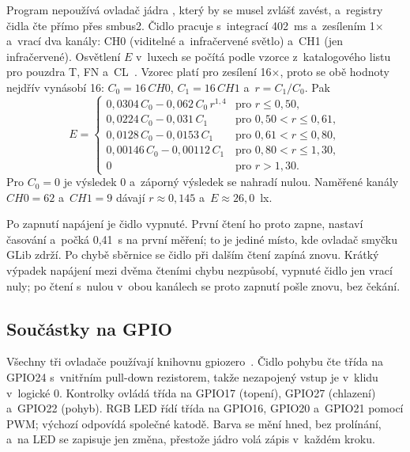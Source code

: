 Program nepoužívá ovladač jádra , který by se musel zvlášť zavést, a~registry čidla
čte přímo přes smbus2. Čidlo pracuje s~integrací 402~ms a~zesílením 1$\times$ a~vrací dva kanály:
CH0 (viditelné a~infračervené světlo) a~CH1 (jen infračervené). Osvětlení $E$ v~luxech se
počítá podle vzorce z~katalogového listu pro pouzdra T, FN a~CL~\cite{tsl2561}. Vzorec platí pro
zesílení 16$\times$, proto se obě hodnoty nejdřív vynásobí 16: $C_0 = 16\,\mathit{CH0}$, $C_1 =
16\,\mathit{CH1}$ a~$r = C_1 / C_0$. Pak
\begin{equation}
  E = \left\{
  \begin{array}{ll}
    0{,}0304\,C_0 - 0{,}062\,C_0\,r^{1{,}4} & \mbox{pro } r \leq 0{,}50, \\
    0{,}0224\,C_0 - 0{,}031\,C_1 & \mbox{pro } 0{,}50 < r \leq 0{,}61, \\
    0{,}0128\,C_0 - 0{,}0153\,C_1 & \mbox{pro } 0{,}61 < r \leq 0{,}80, \\
    0{,}00146\,C_0 - 0{,}00112\,C_1 & \mbox{pro } 0{,}80 < r \leq 1{,}30, \\
    0 & \mbox{pro } r > 1{,}30.
  \end{array}
  \right.
\end{equation}
Pro $C_0 = 0$ je výsledek 0 a~záporný výsledek se nahradí nulou. Naměřené kanály
$\mathit{CH0} = 62$ a~$\mathit{CH1} = 9$ dávají $r \approx 0{,}145$ a~$E \approx 26{,}0$~lx.

Po zapnutí napájení je čidlo vypnuté. První čtení ho proto zapne, nastaví časování a~počká
0,41~s na první měření; to je jediné místo, kde ovladač smyčku GLib zdrží. Po chybě sběrnice se
čidlo při dalším čtení zapíná znovu. Krátký výpadek napájení mezi dvěma čteními chybu nezpůsobí,
vypnuté čidlo jen vrací nuly; po čtení s~nulou v~obou kanálech se proto zapnutí pošle znovu,
bez čekání.

\subsection{Součástky na GPIO}

Všechny tři ovladače používají knihovnu gpiozero~\cite{gpiozero}. Čidlo pohybu čte třída
 na GPIO24 s~vnitřním pull-down rezistorem, takže nezapojený vstup je
v~klidu v~logické 0. Kontrolky ovládá třída  na GPIO17 (topení), GPIO27 (chlazení)
a~GPIO22 (pohyb). RGB LED řídí třída  na GPIO16, GPIO20 a~GPIO21 pomocí PWM; výchozí
 odpovídá společné katodě. Barva se mění hned, bez prolínání, a~na LED se
zapisuje jen změna, přestože jádro volá zápis v~každém kroku.

